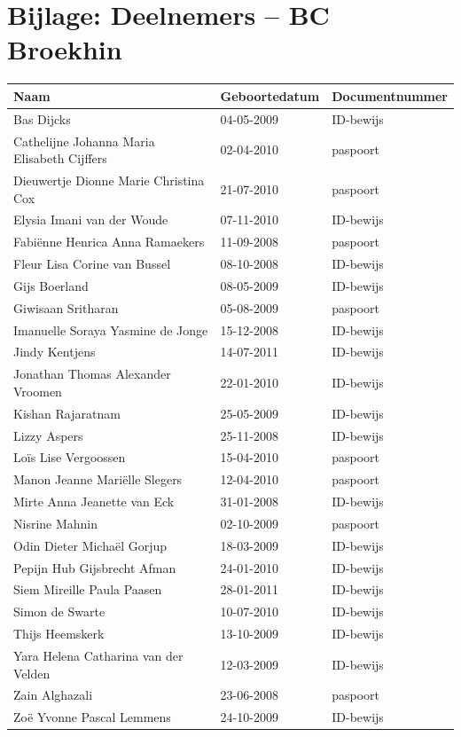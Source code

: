 \documentclass[11pt,a4paper]{letter}
\begin{document}
\newpage
\section*{Bijlage: Deelnemers – BC Broekhin}
\begin{tabular}{|l|l|l|}
\hline
\textbf{Naam} & \textbf{Geboortedatum} & \textbf{Documentnummer} \\ \hline
Bas Dijcks & 04-05-2009 & ID-bewijs \\ \hline
Cathelijne Johanna Maria Elisabeth Cijffers & 02-04-2010 & paspoort \\ \hline
Dieuwertje Dionne Marie Christina Cox & 21-07-2010 & paspoort \\ \hline
Elysia Imani van der Woude & 07-11-2010 & ID-bewijs \\ \hline
Fabiënne Henrica Anna Ramaekers & 11-09-2008 & paspoort \\ \hline
Fleur Lisa Corine van Bussel & 08-10-2008 & ID-bewijs \\ \hline
Gijs Boerland & 08-05-2009 & ID-bewijs \\ \hline
Giwisaan Sritharan & 05-08-2009 & paspoort \\ \hline
Imanuelle Soraya Yasmine de Jonge & 15-12-2008 & ID-bewijs \\ \hline
Jindy Kentjens & 14-07-2011 & ID-bewijs \\ \hline
Jonathan Thomas Alexander Vroomen & 22-01-2010 & ID-bewijs \\ \hline
Kishan Rajaratnam & 25-05-2009 & ID-bewijs \\ \hline
Lizzy Aspers & 25-11-2008 & ID-bewijs \\ \hline
Loïs Lise Vergoossen & 15-04-2010 & paspoort \\ \hline
Manon Jeanne Mariëlle Slegers & 12-04-2010 & paspoort \\ \hline
Mirte Anna Jeanette van Eck & 31-01-2008 & ID-bewijs \\ \hline
Nisrine Mahnin & 02-10-2009 & paspoort \\ \hline
Odin Dieter Michaël Gorjup & 18-03-2009 & ID-bewijs \\ \hline
Pepijn Hub Gijsbrecht Afman & 24-01-2010 & ID-bewijs \\ \hline
Siem Mireille Paula Paasen & 28-01-2011 & ID-bewijs \\ \hline
Simon de Swarte & 10-07-2010 & ID-bewijs \\ \hline
Thijs Heemskerk & 13-10-2009 & ID-bewijs \\ \hline
Yara Helena Catharina van der Velden & 12-03-2009 & ID-bewijs \\ \hline
Zain Alghazali & 23-06-2008 & paspoort \\ \hline
Zoë Yvonne Pascal Lemmens & 24-10-2009 & ID-bewijs \\ \hline
\end{tabular}
\end{document}
